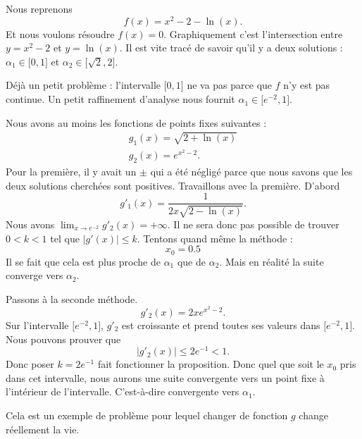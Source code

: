 \begin{example}
	Nous reprenons
	\begin{equation}
		f(x)=x^2-2-\ln(x).
	\end{equation}
	Et nous voulons résoudre \( f(x)=0\). Graphiquement c'est l'intersection entre \( y=x^2-2\) et \( y=\ln(x)\). Il est vite tracé de savoir qu'il y a deux solutions  : \( \alpha_1\in\mathopen[ 0 , 1 \mathclose]\) et \( \alpha_2\in\mathopen[ \sqrt{2} , 2 \mathclose]\).

	Déjà un petit problème : l'intervalle \( \mathopen[ 0 , 1 \mathclose]\) ne va pas parce que \( f\) n'y est pas continue. Un petit raffinement d'analyse nous fournit \( \alpha_1\in\mathopen[ e^{-2} , 1 \mathclose]\).

	Nous avons au moins les fonctions de points fixes suivantes :
	\begin{subequations}
		\begin{align}
			g_1(x)=\sqrt{ 2+\ln(x) } \\
			g_2(x)=e^{x^2-2}.
		\end{align}
	\end{subequations}
	Pour la première, il y avait un \( \pm\) qui a été négligé parce que nous savons que les deux solutions cherchées sont positives.
	Travaillons avec la première. D'abord
	\begin{equation}
		g'_1(x)=\frac{ 1 }{ 2x\sqrt{ 2-\ln(x) } }.
	\end{equation}
	Nous avons \( \lim_{x\to e^{-2}} g'_2(x)=+\infty\). Il ne sera donc pas possible de trouver \( 0<k<1\) tel que \( | g'(x) |\leq k\). Tentons quand même la méthode :
	\begin{equation}
		x_0=0.5
	\end{equation}
	Il se fait que cela est plus proche de \( \alpha_1\) que de \( \alpha_2\). Mais en réalité la suite converge vers \( \alpha_2\).

	Passons à la seconde méthode.
	\begin{equation}
		g'_2(x)=2xe^{x^2-2}.
	\end{equation}
	Sur l'intervalle \( \mathopen[ e^{-2} , 1 \mathclose]\), \( g'_2\) est croissante et prend toutes ses valeurs dans \( \mathopen[ e^{-2} , 1 \mathclose]\). Nous pouvons prouver que
	\begin{equation}
		| g'_2(x) |\leq 2e^{-1}<1.
	\end{equation}
	Donc poser \( k=2e^{-1}\) fait fonctionner la proposition. Donc quel que soit le \( x_0\) pris dans cet intervalle, nous aurons une suite convergente vers un point fixe à l'intérieur de l'intervalle. C'est-à-dire convergente vers \( \alpha_1\).

	Cela est un exemple de problème pour lequel changer de fonction \( g\) change réellement la vie.
\end{example}

